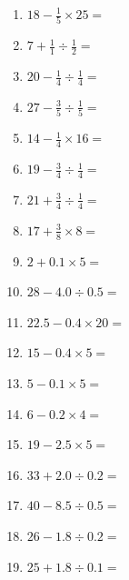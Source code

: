 \documentclass[12pt]{article}
\begin{document}
\begin{enumerate}
\item \large $ 18 - \frac{1}{5} \times 25 = $ \vspace{1.6cm}
\item \large $ 7 + \frac{1}{1} \div \frac{1}{2} = $ \vspace{1.6cm}
\item \large $ 20 - \frac{1}{4} \div \frac{1}{4} = $ \vspace{1.6cm}
\newpage
\item \large $ 27 - \frac{3}{5} \div \frac{1}{5} = $ \vspace{1.6cm}
\item \large $ 14 - \frac{1}{4} \times 16 = $ \vspace{1.6cm}
\item \large $ 19 - \frac{3}{4} \div \frac{1}{4} = $ \vspace{1.6cm}
\item \large $ 21 + \frac{3}{4} \div \frac{1}{4} = $ \vspace{1.6cm}
\item \large $ 17 + \frac{3}{8} \times 8 = $ \vspace{1.6cm}
\item \large $ 2 + 0.1 \times 5 = $ \vspace{1.6cm}
\item \large $ 28 - 4.0 \div 0.5 = $ \vspace{1.6cm}
\item \large $ 22.5 - 0.4 \times 20 = $ \vspace{1.6cm}
\item \large $ 15 - 0.4 \times 5 = $ \vspace{1.6cm}
\item \large $ 5 - 0.1 \times 5 = $ \vspace{1.6cm}
\newpage
\item \large $ 6 - 0.2 \times 4 = $ \vspace{1.6cm}
\item \large $ 19 - 2.5 \times 5 = $ \vspace{1.6cm}
\item \large $ 33 + 2.0 \div 0.2 = $ \vspace{1.6cm}
\item \large $ 40 - 8.5 \div 0.5 = $ \vspace{1.6cm}
\item \large $ 26 - 1.8 \div 0.2 = $ \vspace{1.6cm}
\item \large $ 25 + 1.8 \div 0.1 = $ \vspace{1.6cm}

\end{enumerate}
\end{document}
